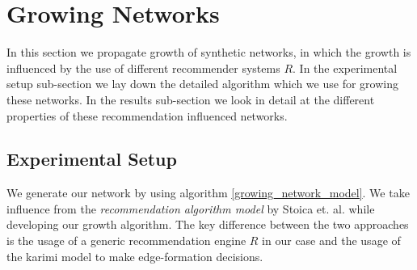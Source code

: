 \section{Growing Networks}
\label{growing_networks}
In this section we propagate growth of synthetic networks, in which the growth is influenced by the use of different recommender systems $R$. In the experimental setup sub-section we lay down the detailed algorithm which we use for growing these networks. In the results sub-section we look in detail at the different properties of these recommendation influenced networks.

\subsection{Experimental Setup}
We generate our network by using algorithm \ref{growing_network_model}. We take influence from the \textit{recommendation algorithm model} by Stoica et. al. \cite{stoica2018algorithmic} while developing our growth algorithm. The key difference between the two approaches is the usage of a generic recommendation engine $R$ in our case and the usage of the karimi model \cite{karimi2018homophily} to make edge-formation decisions. 

